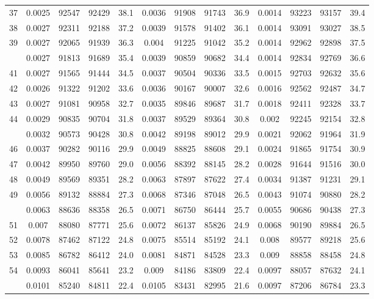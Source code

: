 \documentclass[
  14pt,
]{article}
\begin{document}
\begin{longtable}[t]{lcccccccccccc}
37 & 0.0025 & 92547 & 92429 & 38.1 & 0.0036 & 91908 & 91743 & 36.9 & 0.0014 & 93223 & 93157 & 39.4\\
38 & 0.0027 & 92311 & 92188 & 37.2 & 0.0039 & 91578 & 91402 & 36.1 & 0.0014 & 93091 & 93027 & 38.5\\
39 & 0.0027 & 92065 & 91939 & 36.3 & 0.004 & 91225 & 91042 & 35.2 & 0.0014 & 92962 & 92898 & 37.5\\
\addlinespace
40 & 0.0027 & 91813 & 91689 & 35.4 & 0.0039 & 90859 & 90682 & 34.4 & 0.0014 & 92834 & 92769 & 36.6\\
41 & 0.0027 & 91565 & 91444 & 34.5 & 0.0037 & 90504 & 90336 & 33.5 & 0.0015 & 92703 & 92632 & 35.6\\
42 & 0.0026 & 91322 & 91202 & 33.6 & 0.0036 & 90167 & 90007 & 32.6 & 0.0016 & 92562 & 92487 & 34.7\\
43 & 0.0027 & 91081 & 90958 & 32.7 & 0.0035 & 89846 & 89687 & 31.7 & 0.0018 & 92411 & 92328 & 33.7\\
44 & 0.0029 & 90835 & 90704 & 31.8 & 0.0037 & 89529 & 89364 & 30.8 & 0.002 & 92245 & 92154 & 32.8\\
\addlinespace
45 & 0.0032 & 90573 & 90428 & 30.8 & 0.0042 & 89198 & 89012 & 29.9 & 0.0021 & 92062 & 91964 & 31.9\\
46 & 0.0037 & 90282 & 90116 & 29.9 & 0.0049 & 88825 & 88608 & 29.1 & 0.0024 & 91865 & 91754 & 30.9\\
47 & 0.0042 & 89950 & 89760 & 29.0 & 0.0056 & 88392 & 88145 & 28.2 & 0.0028 & 91644 & 91516 & 30.0\\
48 & 0.0049 & 89569 & 89351 & 28.2 & 0.0063 & 87897 & 87622 & 27.4 & 0.0034 & 91387 & 91231 & 29.1\\
49 & 0.0056 & 89132 & 88884 & 27.3 & 0.0068 & 87346 & 87048 & 26.5 & 0.0043 & 91074 & 90880 & 28.2\\
\addlinespace
50 & 0.0063 & 88636 & 88358 & 26.5 & 0.0071 & 86750 & 86444 & 25.7 & 0.0055 & 90686 & 90438 & 27.3\\
51 & 0.007 & 88080 & 87771 & 25.6 & 0.0072 & 86137 & 85826 & 24.9 & 0.0068 & 90190 & 89884 & 26.5\\
52 & 0.0078 & 87462 & 87122 & 24.8 & 0.0075 & 85514 & 85192 & 24.1 & 0.008 & 89577 & 89218 & 25.6\\
53 & 0.0085 & 86782 & 86412 & 24.0 & 0.0081 & 84871 & 84528 & 23.3 & 0.009 & 88858 & 88458 & 24.8\\
54 & 0.0093 & 86041 & 85641 & 23.2 & 0.009 & 84186 & 83809 & 22.4 & 0.0097 & 88057 & 87632 & 24.1\\
\addlinespace
55 & 0.0101 & 85240 & 84811 & 22.4 & 0.0105 & 83431 & 82995 & 21.6 & 0.0097 & 87206 & 86784 & 23.3\\

\end{longtable}
\end{document}
